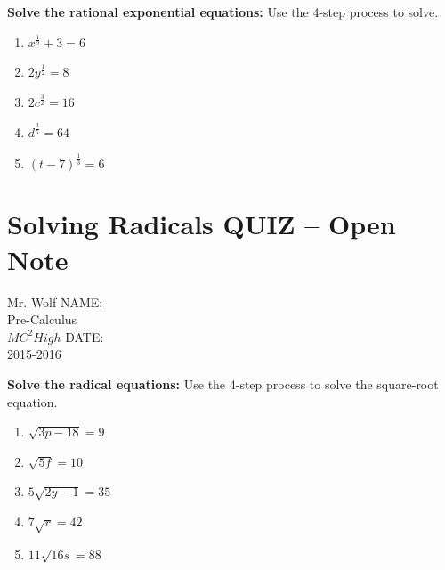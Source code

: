 \documentclass[12pt]{article}
\begin{document}
\pagebreak

\textbf{Solve the rational exponential equations:} Use the 4-step process to solve.\\

\begin{enumerate}[resume]

	\item $x^{\frac{1}{2}}+3=6$\\
	
	\item $2y^{\frac{1}{2}}=8$\\
	
	\item $2c^{\frac{3}{2}}=16$\\
	
	\item $d^{\frac{3}{5}}=64$\\
	
	\item $(t-7)^{\frac{1}{3}}=6$\\


\end{enumerate}

\pagebreak

\section{Solving Radicals QUIZ -- Open Note}

Mr. Wolf \hfill NAME:\underline{\hspace{3in}}\\ 
Pre-Calculus \\ 
$MC^2 High$ \hfill DATE:\underline{\hspace{2in}}\\
2015-2016



\textbf{Solve the radical equations:} Use the 4-step process to solve the square-root equation.\\

\begin{enumerate}
	
		\item $\sqrt{3p-18}=9$\\
		
		\item $\sqrt{5f}=10$\\
		
		\item $5\sqrt{2y-1}=35$\\
		
		\item $7\sqrt{r}=42$\\
		
		\item $11\sqrt{16s}=88$\\
	
\end{enumerate}
\end{document}
